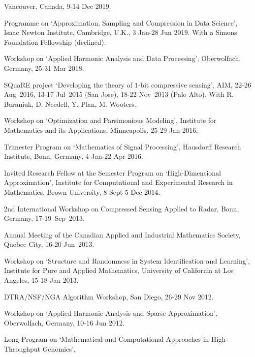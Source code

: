 \documentclass[11pt]{article}
\begin{document}
Vancouver, Canada, 9-14 Dec 2019.
\item Programme on `Approximation, Sampling and Compression in Data Science',
Isaac Newton Institute, Cambridge, U.K., 3 Jan-28 Jun 2019.
With a Simons Foundation Fellowship (declined).
\item  Workshop on `Applied Harmonic Analysis and Data Processing', Oberwolfach, Germany, 25-31 Mar 2018.
\item SQuaRE project `Developing the theory of $1$-bit compressive sensing',
AIM, 22-26 Aug~2016, 13-17 Jul~2015 (San Jose), 18-22 Nov~2013 (Palo Alto). With R. Baraniuk, D. Needell, Y. Plan, M. Wooters.
\item Workshop on `Optimization and Parsimonious Modeling', 
Institute for Mathematics and its Applications, Minneapolis, 25-29 Jan 2016.
\item Trimester Program on `Mathematics of Signal Processing', Hausdorff Research Institute, Bonn, Germany,
4 Jan-22 Apr 2016.
\item Invited Research Fellow at the Semester Program on `High-Dimensional Approximation', 
Institute for Computational and Experimental Research in Mathematics, Brown University,
8 Sept-5 Dec 2014.
\item 2nd International Workshop on Compressed Sensing Applied to Radar,
Bonn, Germany, 17-19~Sep~2013.
\item Annual Meeting of the Canadian Applied
and Industrial Mathematics Society, Quebec City, 16-20 Jun~2013. 
\item Workshop on `Structure and Randomness in System Identification and Learning',
Institute for Pure and Applied Mathematics, University of California at Los Angeles, 15-18 Jan 2013.
\item DTRA/NSF/NGA Algorithm Workshop, San Diego, 26-29 Nov 2012.
\item Workshop on `Applied Harmonic Analysis and Sparse Approximation', Oberwolfach, Germany, 10-16 Jun 2012.
\item Long Program on `Mathematical and Computational Approaches in High-Throughput Genomics', 
\end{document}

